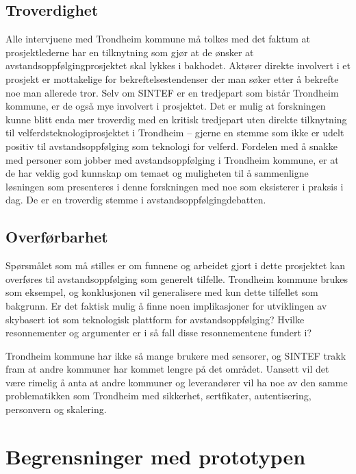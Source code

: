 \subsection{Troverdighet}
Alle intervjuene med Trondheim kommune må tolkes med det faktum at prosjektlederne har en tilknytning som
gjør at de ønsker at avstandsoppfølgingprosjektet
skal lykkes i bakhodet. Aktører direkte involvert i et prosjekt er mottakelige for bekreftelsestendenser der man søker etter å bekrefte noe
man allerede tror. Selv om SINTEF er en tredjepart som bistår Trondheim kommune, er de også mye involvert i prosjektet.
Det er mulig at forskningen kunne blitt enda mer troverdig med en kritisk tredjepart uten direkte tilknytning til velferdsteknologiprosjektet i Trondheim --
gjerne en stemme som ikke er udelt positiv til avstandsoppfølging som teknologi for velferd.
Fordelen med å snakke med personer som jobber med avstandsoppfølging i Trondheim kommune, er at de har veldig god kunnskap om temaet
og muligheten til å sammenligne løsningen som presenteres i denne forskningen med noe som eksisterer i praksis i dag.
De er en troverdig stemme i avstandsoppfølgingdebatten.

\subsection{Overførbarhet}
Spørsmålet som må stilles er om funnene og arbeidet gjort i dette prosjektet kan overføres til avstandsoppfølging som generelt tilfelle.
Trondheim kommune brukes som eksempel, og konklusjonen vil generalisere med kun dette tilfellet som bakgrunn.
Er det faktisk mulig å finne noen implikasjoner for utviklingen av skybasert \gls{iot} som teknologisk plattform for avstandsoppfølging?
Hvilke resonnementer og argumenter er i så fall disse resonnementene fundert i?

Trondheim kommune har ikke så mange brukere med sensorer, og SINTEF trakk fram at andre kommuner har kommet lengre på det området. Uansett
vil det være rimelig å anta at andre kommuner og leverandører vil ha noe av den samme problematikken som Trondheim med sikkerhet, sertfikater, autentisering,
personvern og skalering.

\iffalse
\section{Begrensninger med
prototypen}\label{begrensninger-med-prototypen}

